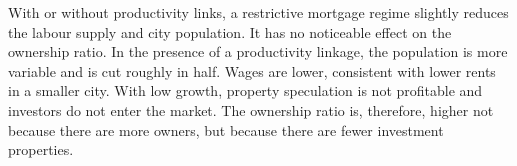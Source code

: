 With or without productivity links, a restrictive mortgage regime slightly reduces the labour supply and city population. It has no noticeable effect on the ownership ratio. In the presence of a productivity linkage, the population is more variable and is cut roughly in half. Wages are lower, consistent with lower rents in a smaller city. With low growth, property speculation is not profitable and investors do not enter the market. The ownership ratio is, therefore, higher not because there are more owners, but because there are fewer investment properties. 

